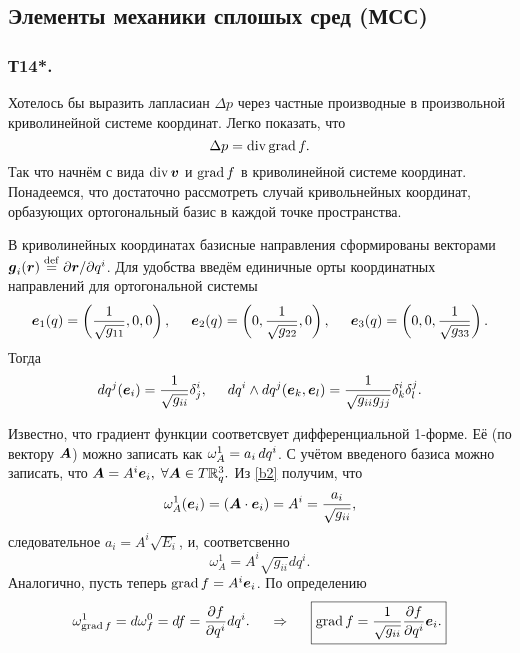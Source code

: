 \subsection{Элементы механики сплошых сред (МСС)}


\subsubsection*{Т14*.}

Хотелось бы выразить лапласиан $\Delta p$ через частные производные в произвольной криволинейной системе координат. Легко показать, что
\begin{equation}
    \Delta p = \mathop{\mathrm{div}}\nolimits \mathop{\mathrm{grad}}\nolimits f.
\end{equation}
Так что начнём с вида $\mathop{\mathrm{div}}\nolimits \mbox{\boldmath $v$}$ и $\mathop{\mathrm{grad}}\nolimits f$ в криволинейной системе координат. Понадеемся, что достаточно рассмотреть случай кривольнейных координат, орбазующих ортогональный базис в каждой точке пространства. 

В криволинейных координатах базисные направления сформированы векторами $\mbox{\boldmath $g$}_i (\mbox{\boldmath $r$}) \overset{\mathrm{def}}{=} \partial \mbox{\boldmath $r$} / \partial q^i$. Для удобства введём единичные орты координатных направлений для ортогональной системы
\begin{equation}
\label{b1}
    \mbox{\boldmath $e$}_1 (q) = \left(
        \frac{1}{\sqrt{g_{11}}}, 0, 0
    \right), \hspace{0.5cm} 
    \mbox{\boldmath $e$}_2 (q) = \left(
        0, \frac{1}{\sqrt{g_{22}}}, 0
    \right), \hspace{0.5cm} 
    \mbox{\boldmath $e$}_3 (q) = \left(
        0, 0, \frac{1}{\sqrt{g_{33}}}
    \right).
\end{equation}
Тогда
\begin{align}
\label{b2}
    d q^j (\mbox{\boldmath $e$}_i) = \frac{1}{\sqrt{g_{ii}}} \delta^i_j,
    \hspace{0.5cm} 
    dq^i \wedge d q^j (\mbox{\boldmath $e$}_k, \mbox{\boldmath $e$}_l) = \frac{1}{\sqrt{g_{ii} g_{jj}}} \delta^{i}_{k} \delta^j_l.
\end{align}


Известно, что градиент функции соответсвует дифференциальной 1-форме. 
Её (по вектору $\mbox{\boldmath $A$}$) можно записать как $\omega^1_{A} = a_i \, d q^i$.
С учётом введеного базиса можно записать, что 
$ \mbox{\boldmath $A$} = A^i \mbox{\boldmath $e$}_i, \; \forall \mbox{\boldmath $A$} \in T \mathbb{R}_q^3. $
Из \eqref{b2} получим, что
$$
    \omega^1_A (\mbox{\boldmath $e$}_i) = (\mbox{\boldmath $A$} \cdot \mbox{\boldmath $e$}_i) = A^i = \frac{a_i}{\sqrt{g_{ii}}},
$$
следовательное $a_i = A^i \sqrt{E_i}$, и, соответсвенно
\begin{equation}
    \omega^1_A = A^i \sqrt{g_{ii}} dq^i.
\end{equation}
Аналогично, пусть теперь $\mathop{\mathrm{grad}}\nolimits f = A^i \mbox{\boldmath $e$}_i$. По определению
$$
    \omega^1_{\mathop{\mathrm{grad}}\nolimits f} = d \omega_f^0 = d f = \frac{\partial f}{\partial q^i} d q^i.
    \hspace{0.5cm} \Rightarrow \hspace{0.5cm} 
    \boxed{
        \mathop{\mathrm{grad}}\nolimits f = \frac{1}{\sqrt{g_{ii}}}  \frac{\partial f}{\partial q^i} \mbox{\boldmath $e$}_i.    
    }
$$

